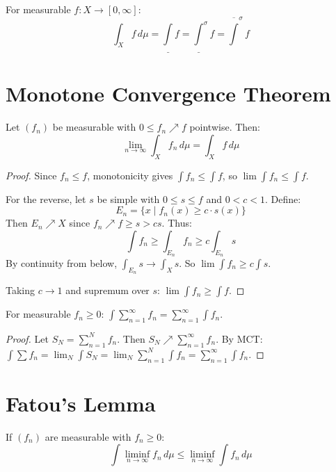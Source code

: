\begin{definition}
For measurable $f: X \to [0, \infty]$:
\[ \int_X f \, d\mu = \underline{\int} f = \underline{\int}^\sigma f = \overline{\int}^\sigma f \]
\end{definition}

\section{Monotone Convergence Theorem}

\begin{theorem}
Let $(f_n)$ be measurable with $0 \leq f_n \nearrow f$ pointwise. Then:
\[ \lim_{n \to \infty} \int_X f_n \, d\mu = \int_X f \, d\mu \]
\end{theorem}

\begin{proof}
Since $f_n \leq f$, monotonicity gives $\int f_n \leq \int f$, so $\lim \int f_n \leq \int f$.

For the reverse, let $s$ be simple with $0 \leq s \leq f$ and $0 < c < 1$. Define:
\[ E_n = \{x \mid f_n(x) \geq c \cdot s(x)\} \]
Then $E_n \nearrow X$ since $f_n \nearrow f \geq s > cs$. Thus:
\[ \int f_n \geq \int_{E_n} f_n \geq c \int_{E_n} s \]
By continuity from below, $\int_{E_n} s \to \int_X s$. So $\lim \int f_n \geq c \int s$.

Taking $c \to 1$ and supremum over $s$: $\lim \int f_n \geq \int f$.
\end{proof}

\begin{corollary}
For measurable $f_n \geq 0$: $\int \sum_{n=1}^\infty f_n = \sum_{n=1}^\infty \int f_n$.
\end{corollary}

\begin{proof}
Let $S_N = \sum_{n=1}^N f_n$. Then $S_N \nearrow \sum_{n=1}^\infty f_n$. By MCT: $\int \sum f_n = \lim_N \int S_N = \lim_N \sum_{n=1}^N \int f_n = \sum_{n=1}^\infty \int f_n$.
\end{proof}

\section{Fatou's Lemma}

\begin{theorem}
If $(f_n)$ are measurable with $f_n \geq 0$:
\[ \int \liminf_{n \to \infty} f_n \, d\mu \leq \liminf_{n \to \infty} \int f_n \, d\mu \]
\end{theorem}

